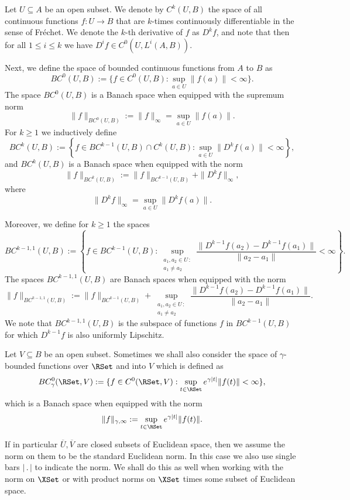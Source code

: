 \documentclass[a4paper]{siamart190516}
\begin{document}
Let $U \subseteq A$ be an open subset. We denote by $C^k(U,B)$ the space of all continuous functions $f: U \rightarrow B$ that are $k$-times continuously differentiable in the sense of Fr\'echet. We denote the $k$-th derivative of $f$ as $D^k f$, and note that then for all $1 \leq i \leq k$ we have $D^i f \in C^0(U, L^{i}(A,B))$.

Next, we define the space of bounded continuous functions from $A$ to $B$ as
\[
BC^0(U,B) := \{ f \in C^0(U,B): \sup_{a \in U}\|f(a)\| < \infty \}.
\]
The space $BC^0(U,B)$ is a Banach space when equipped with the supremum norm
\[
\| f \|_{BC^0(U,B)} :=  \| f \|_{\infty} = \sup_{a \in U}\|f(a)\|.
\]
For $k \geq 1$ we inductively define
\[
BC^k(U,B) := \left\{ f \in BC^{k-1}(U,B) \cap C^k(U,B): \sup_{a \in U}\|D^k f(a)\| < \infty \right\},
\]
and $BC^k(U,B)$ is a Banach space when equipped with the norm
\[
\| f \|_{BC^k(U,B)} :=  \| f \|_{BC^{k-1}(U,B)} +  \|D^k f \|_{\infty},
\]
where 
\[
 \|D^k f \|_{\infty} = \sup_{a \in U}\|D^k f(a)\|.
\]

Moreover, we define for $k \geq 1$ the spaces  
 \[
 BC^{k-1,1}(U,B) :=  \left\{ f \in BC^{k-1}(U, B): \sup_{\substack{a_1,a_2 \in U \,: \\ a_1 \neq a_2}} \frac{\|D^{k-1}f(a_2)-D^{k-1}f(a_1)\|}{\|a_2-a_1\|} < \infty \right\}.
 \]
The spaces $BC^{k-1,1}(U,B)$ are Banach spaces when equipped with the norm
\[
\| f \|_{BC^{k-1,1}(U,B)} := \| f \|_{BC^{k-1}(U,B)} + \sup_{\substack{a_1,a_2 \in U \,: \\ a_1 \neq a_2}} \frac{\|D^{k-1}f(a_2)-D^{k-1}f(a_1)\|}{\|a_2-a_1\|}.
\]
We note that  $BC^{k-1,1}(U,B)$ is the subspace of functions $f$ in $BC^{k-1}(U,B)$ for which $D^{k-1}f$ is also uniformly Lipschitz.

Let $V \subseteq B$ be an open subset. Sometimes we shall also consider the space of $\gamma$-bounded functions over $\RSet$ and into $V$ which is defined as
\[
BC_{\gamma}^0(\RSet,V) := \{ f \in C^0(\RSet,V): \sup_{t \in \RSet} e^{\gamma |t|} \|f(t)\| < \infty \},
\]
which is a Banach space when equipped with the norm
\[
\| f \|_{\gamma,\infty} :=   \sup_{t \in \RSet} e^{\gamma |t|} \|f(t)\|.
\]

  
If in particular $\overline{U}, \overline{V}$ are closed subsets of Euclidean space, then we assume the norm on them to be the standard Euclidean norm. In this case we also use single bars $| \, . \, |$ to indicate the norm. We shall do this as well when working with the norm on $\XSet$ or with product norms on $\XSet$ times some subset of Euclidean space.
\end{document}
